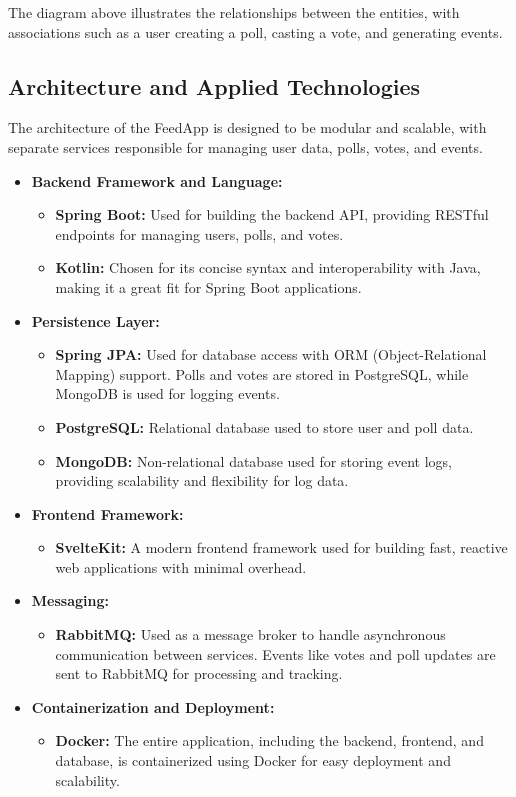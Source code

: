 \noindent The diagram above illustrates the relationships between the entities, with associations such as a user creating a poll, casting a vote, and generating events.
\subsection{Architecture and Applied Technologies}
The architecture of the FeedApp is designed to be modular and scalable, with separate services responsible for managing user data, polls, votes, and events. 
\begin{itemize}
    \item \textbf{Backend Framework and Language:} 
    \begin{itemize}
        \item \textbf{Spring Boot:} Used for building the backend API, providing RESTful endpoints for managing users, polls, and votes.
        \item \textbf{Kotlin:} Chosen for its concise syntax and interoperability with Java, making it a great fit for Spring Boot applications.
    \end{itemize}
    
    \item \textbf{Persistence Layer:} 
    \begin{itemize}
        \item \textbf{Spring JPA:} Used for database access with ORM (Object-Relational Mapping) support. Polls and votes are stored in PostgreSQL, while MongoDB is used for logging events.
        \item \textbf{PostgreSQL:} Relational database used to store user and poll data.
        \item \textbf{MongoDB:} Non-relational database used for storing event logs, providing scalability and flexibility for log data.
    \end{itemize}
    
    \item \textbf{Frontend Framework:} 
    \begin{itemize}
        \item \textbf{SvelteKit:} A modern frontend framework used for building fast, reactive web applications with minimal overhead.
    \end{itemize}
    
    \item \textbf{Messaging:}
    \begin{itemize}
        \item \textbf{RabbitMQ:} Used as a message broker to handle asynchronous communication between services. Events like votes and poll updates are sent to RabbitMQ for processing and tracking.
    \end{itemize}
    \item \textbf{Containerization and Deployment:} 
    \begin{itemize}
        \item \textbf{Docker:} The entire application, including the backend, frontend, and database, is containerized using Docker for easy deployment and scalability.
    \end{itemize}
\end{itemize}
